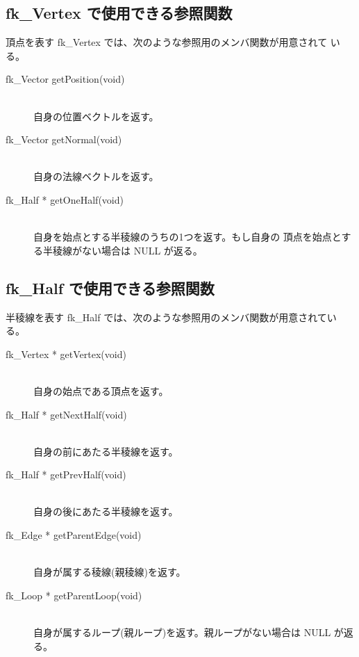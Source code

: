 \subsection{fk\_Vertex で使用できる参照関数}
頂点を表す fk\_Vertex では、次のような参照用のメンバ関数が用意されて
いる。
\begin{description}
 \item[\hspace*{0.6cm}fk\_Vector getPosition(void)] ~ \\
	自身の位置ベクトルを返す。
 \item[\hspace*{0.6cm}fk\_Vector getNormal(void)] ~ \\
	自身の法線ベクトルを返す。
 \item[\hspace*{0.6cm}fk\_Half * getOneHalf(void)] ~ \\
	自身を始点とする半稜線のうちの1つを返す。もし自身の
	頂点を始点とする半稜線がない場合は NULL が返る。
\end{description}

\subsection{fk\_Half で使用できる参照関数}
半稜線を表す fk\_Half では、次のような参照用のメンバ関数が用意されている。
\begin{description}
 \item[\hspace*{0.6cm}fk\_Vertex * getVertex(void)] ~ \\
	自身の始点である頂点を返す。
 \item[\hspace*{0.6cm}fk\_Half * getNextHalf(void)] ~ \\
	自身の前にあたる半稜線を返す。
 \item[\hspace*{0.6cm}fk\_Half * getPrevHalf(void)] ~ \\
	自身の後にあたる半稜線を返す。
 \item[\hspace*{0.6cm}fk\_Edge * getParentEdge(void)] ~ \\
	自身が属する稜線(親稜線)を返す。
 \item[\hspace*{0.6cm}fk\_Loop * getParentLoop(void)] ~ \\
	自身が属するループ(親ループ)を返す。親ループがない場合は
	NULL が返る。
\end{description}


